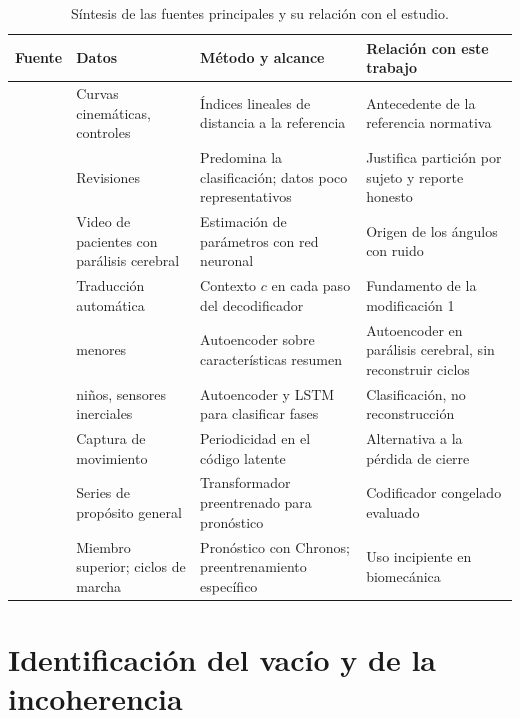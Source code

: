 \documentclass[11pt,a4paper]{article}
\begin{document}
\begin{table}[h]
\centering\footnotesize
\setlength{\tabcolsep}{3pt}
\begin{tabularx}{\textwidth}{@{}>{\raggedright\arraybackslash}p{2.4cm}>{\raggedright\arraybackslash}p{3.0cm}>{\raggedright\arraybackslash}X>{\raggedright\arraybackslash}p{3.6cm}@{}}
\toprule
Fuente & Datos & Método y alcance & Relación con este trabajo \\
\midrule
\cite{schwartz2008,baker2009} & Curvas cinemáticas, controles & Índices lineales de distancia a la referencia & Antecedente de la referencia normativa \\
\cite{halilaj2018,samadi2024} & Revisiones & Predomina la clasificación; datos poco representativos & Justifica partición por sujeto y reporte honesto \\
\cite{kidzinski2020} & Video de pacientes con parálisis cerebral & Estimación de parámetros con red neuronal & Origen de los ángulos con ruido \\
\cite{cho2014} & Traducción automática & Contexto $c$ en cada paso del decodificador & Fundamento de la modificación 1 \\
\cite{wang2024} & 412 menores & Autoencoder sobre características resumen & Autoencoder en parálisis cerebral, sin reconstruir ciclos \\
\cite{pang2025} & 6 niños, sensores inerciales & Autoencoder y LSTM para clasificar fases & Clasificación, no reconstrucción \\
\cite{starke2022} & Captura de movimiento & Periodicidad en el código latente & Alternativa a la pérdida de cierre \\
\cite{das2024timesfm,timesfm25} & Series de propósito general & Transformador preentrenado para pronóstico & Codificador congelado evaluado \\
\cite{akbarifar2025,dey2025} & Miembro superior; ciclos de marcha & Pronóstico con Chronos; preentrenamiento específico & Uso incipiente en biomecánica \\
\bottomrule
\end{tabularx}
\caption{Síntesis de las fuentes principales y su relación con el estudio.}
\label{tab:sintesis}
\end{table}

\section{Identificación del vacío y de la incoherencia}
\label{sec:vacio}
\end{document}
